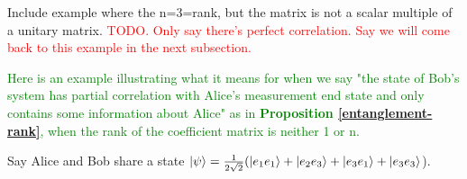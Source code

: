 \begin{example}
\label{example rank full not orth}
Include example where the n=3=rank, but the matrix is not a scalar multiple of a unitary matrix.
\textcolor{red}{TODO. Only say there's perfect correlation. Say we will come back to this example in the next subsection.}
\end{example}

\textcolor{green}{Here is an example illustrating what it means for when we say "the state of Bob's system has partial correlation with Alice's measurement end state and only contains some information about Alice" as in \textbf{Proposition \ref{entanglement-rank}}, when the rank of the coefficient matrix is neither 1 or n.}
\begin{example}
\label{example rank not full}
Say Alice and Bob share a state $\ket{\psi}=\frac{1}{2\sqrt{2}}(\ket{e_1 e_1}+\ket{e_2 e_3}+\ket{e_3 e_1}+\ket{e_3 e_3}$).


\end{example}
